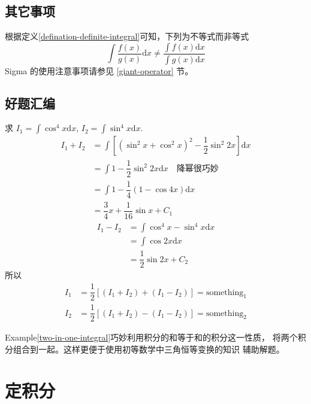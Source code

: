 \subsection{其它事项}

根据定义\ref{defination-definite-integral}可知，下列为不等式而非等式
\[
    \int \dfrac{f(x)}{g(x)} \mathrm{d}x 
    \neq 
    \dfrac{\int f(x) \mathrm{d} x}{\int g(x) \mathrm{d} x}
\]
Sigma 的使用注意事项请参见 \ref{giant-operator} 节。

\subsection{好题汇编}

\begin{example}\label{two-in-one-integral}
    求 $I_1 = \int \cos ^4 x \mathrm{d} x$, $I_2 = \int \sin ^4 x \mathrm{d} x$.
    \begin{align*}
        I_1 + I_2 &= \int 
                    \left[
                        (\sin ^2 x + \cos ^2 x)^2 - \dfrac{1}{2} \sin ^2 2x
                    \right] \mathrm{d}x \\
                  &= \int 1 - \dfrac{1}{2} \sin ^2 2x \mathrm{d} x \quad \mbox{降幂很巧妙}\\
                  &= \int 1 - \dfrac{1}{4} (1-\cos 4x) \mathrm{d} x \\
                  &= \dfrac{3}{4} x + \dfrac{1}{16} \sin x + C_1
    \end{align*}
    \begin{align*}
        I_1 - I_2 &= \int \cos ^4 x - \sin ^4 x \mathrm{d}x \\
                  &= \int \cos 2x \mathrm{d}x \\
                  &= \dfrac{1}{2} \sin 2x +C_2
    \end{align*}
    所以
    \begin{align*}
        I_1 &= \dfrac{1}{2} \left[(I_1+I_2)+(I_1-I_2)\right]=\mbox{something}_1 \\ 
        I_2 &= \dfrac{1}{2} \left[(I_1+I_2)-(I_1-I_2)\right]=\mbox{something}_2
    \end{align*}
    \cite[page 26, question 57]{w660ans}
\end{example}
Example\ref{two-in-one-integral}巧妙利用积分的和等于和的积分这一性质，
将两个积分组合到一起。这样更便于使用初等数学中三角恒等变换的知识
辅助解题。


\section{定积分}\label{finite-integral}

